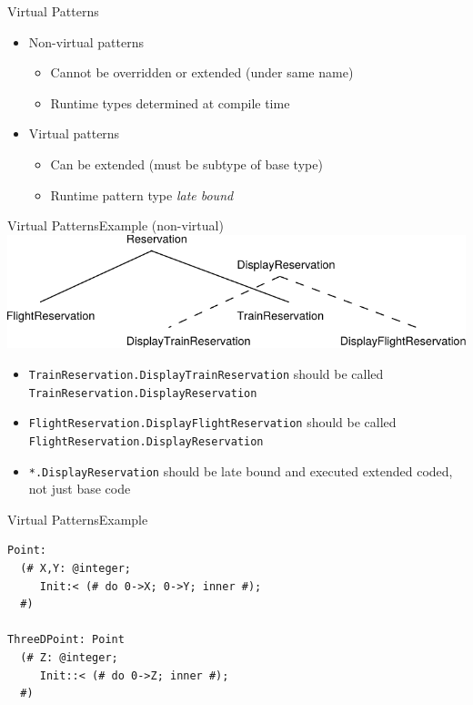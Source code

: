 \documentclass[xcolor=dvipsname,handout]{beamer} %
\begin{document}
\begin{frame}{Virtual Patterns}
\begin{itemize}
  \item Non-virtual patterns
  \begin{itemize}
    \item Cannot be overridden or extended (under same name)
    \item Runtime types determined at compile time
  \end{itemize}
  \item Virtual patterns
  \begin{itemize}
    \item Can be extended (must be subtype of base type)
    \item Runtime pattern type \emph{late bound}
  \end{itemize}
\end{itemize}
\end{frame}

\begin{frame}{Virtual Patterns}{Example (non-virtual)}
\includegraphics[width=\textwidth]{resources/beta_virtual}
\vfill
\begin{itemize}
  \item \texttt{TrainReservation.DisplayTrainReservation} should be called \texttt{TrainReservation.DisplayReservation}
  \item \texttt{FlightReservation.DisplayFlightReservation} should be called \texttt{FlightReservation.DisplayReservation}
  \item \texttt{*.DisplayReservation} should be late bound and executed extended coded, not just base code
\end{itemize}
\end{frame}

\begin{frame}[fragile]{Virtual Patterns}{Example}
\begin{verbatim}
Point:
  (# X,Y: @integer;
     Init:< (# do 0->X; 0->Y; inner #);
  #)

ThreeDPoint: Point
  (# Z: @integer;
     Init::< (# do 0->Z; inner #);
  #)
\end{verbatim}
\end{frame}
\end{document}
